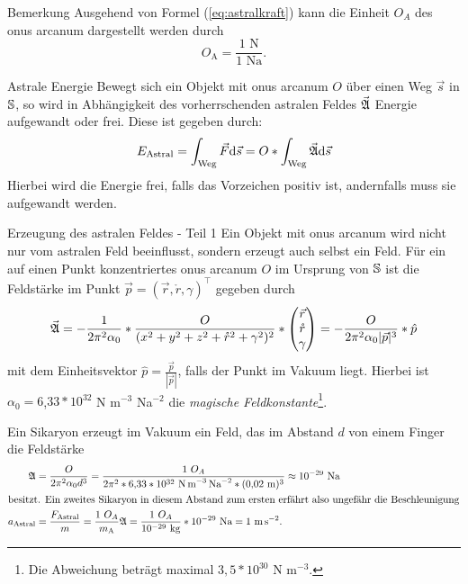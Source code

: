 \begin{bla}{Bemerkung}
Ausgehend von Formel (\ref{eq:astralkraft}) kann die Einheit $O_A$ des onus arcanum dargestellt werden durch
\begin{equation}
O_\text{A}=\frac{1\text{ N}}{1\text{ Na}}\text{.}
\end{equation}
\end{bla}
\begin{bla}{Astrale Energie}\label{astralenergie}
Bewegt sich ein Objekt mit onus arcanum $O$ über einen Weg $\vec{s}$ in $\mathbb{S}$, so wird in Abhängigkeit des vorherrschenden astralen Feldes $\vec{\mathfrak{A}}$ Energie aufgewandt oder frei. Diese ist gegeben durch:
\begin{equation}
E_\text{Astral}=\int_\text{Weg}\vec{F}\text{\rmfamily d} \vec{s}=O*\int_\text{Weg}\vec{\mathfrak{A}}\text{\rmfamily d} \vec{s}
\end{equation}
Hierbei wird die Energie frei, falls das Vorzeichen positiv ist, andernfalls muss sie aufgewandt werden.
\end{bla}
\begin{bla}{Erzeugung des astralen Feldes - Teil 1}
Ein Objekt mit onus arcanum wird nicht nur vom astralen Feld beeinflusst, sondern erzeugt auch selbst ein Feld. Für ein auf einen Punkt konzentriertes onus arcanum $O$ im Ursprung von $\mathbb{S}$ ist die Feldstärke im Punkt $\vec{p}=(\vec{r},\mathring{r},\gamma)^\top$ gegeben durch
\begin{equation}
\vec{\mathfrak{A}}=-\frac{1}{2\pi^2\alpha_0}*\frac{O}{(x^2+y^2+z^2+\mathring{r}^2+\gamma^2)^2}*\begin{pmatrix}\vec{r}\\\mathring{r}\\\gamma\end{pmatrix}=-\frac{O}{2\pi^2\alpha_0|\vec{p}|^3}*\hat{p}
\end{equation}
mit dem Einheitsvektor $\hat{p}=\frac{\vec{p}}{|\vec{p}|}$, falls der Punkt im Vakuum liegt. Hierbei ist $\alpha_0=6$,$33*10^{32}$ N\! m$^{-3}$\! Na$^{-2}$ die \emph{magische Feldkonstante}\footnote{Die Abweichung beträgt maximal $3,5*10^{30}$ N\! m$^{-3}$.}.
\end{bla}
\begin{bsp}
Ein Sikaryon erzeugt im Vakuum ein Feld, das im Abstand $d$ von einem Finger die Feldstärke
\begin{align*}
\mathfrak{A}&=\frac{O}{2\pi^2\alpha_0d^3}=\frac{1\text{ }O_A}{2\pi^2*6{,}33*10^{32}\text{ N\! m}^{-3}\text{\! Na}^{-2}*(0{,}02\text{ m})^3}\approx10^{-29}\text{ Na}\\
\intertext{besitzt. Ein zweites Sikaryon in diesem Abstand zum ersten erfährt also ungefähr die Beschleunigung}
a_\text{Astral}&=\frac{F_\text{Astral}}{m}=\frac{1\text{ }O_A}{m_\text{A}}\mathfrak{A}=\frac{1\text{ }O_A}{10^{-29}\text{ kg}}*10^{-29}\text{ Na}=1\text{ m\! s}^{-2}\text{.}
\end{align*}
\end{bsp}
